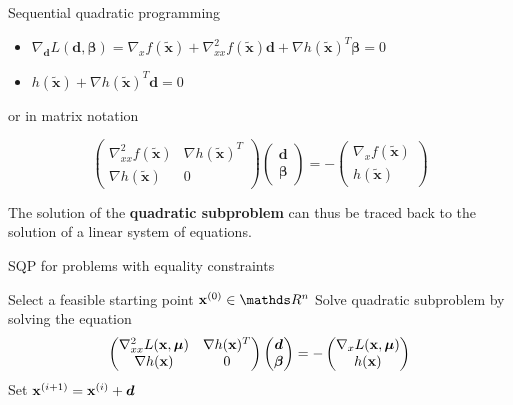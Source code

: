 \begin{vbframe}{Sequential quadratic programming}
\begin{itemize}
\item $\nabla_{\bm{d}} L(\bm{d}, \bm{\beta}) = \nabla_{x} f(\bm{\tilde x}) + \nabla^2_{xx} f(\bm{\tilde x}) \bm{d} + \nabla h(\bm{\tilde x})^T\bm{\beta} = 0$
\item $h(\bm{\tilde x}) + \nabla h(\bm{\tilde x})^T\bm{d} = 0$
\end{itemize}

or in matrix notation

$$
\begin{pmatrix} \nabla^2_{xx} f(\bm{\tilde x}) & \nabla h(\bm{\tilde x})^T \\ \nabla h(\bm{\tilde x}) & 0 \end{pmatrix} \begin{pmatrix} \bm{d} \\ \bm{\beta} \end{pmatrix} = - \begin{pmatrix} \nabla_{x} f(\bm{\tilde x}) \\ h(\bm{\tilde x}) \end{pmatrix}
$$

The solution of the \textbf{quadratic subproblem} can thus be traced back to the solution of a linear system of equations.


\framebreak

\begin{algorithm}[H]
  \caption{SQP for problems with equality constraints}
  \begin{algorithmic}[1]
  \State Select a feasible starting point $\mathbf{x}^{(0)} \in \R^n$
    \State Solve quadratic subproblem by solving the equation
    $$\begin{pmatrix} \nabla^2_{xx} L(\mathbf{x}, \bm{\mu}) & \nabla h(\mathbf{x})^T \\ \nabla h(\mathbf{x}) & 0 \end{pmatrix} \begin{pmatrix} \bm{d} \\ \bm{\beta} \end{pmatrix} = - \begin{pmatrix} \nabla_{x} L(\mathbf{x}, \bm{\mu}) \\ h(\mathbf{x}) \end{pmatrix}$$
    \State Set $\mathbf{x}^{(i + 1)} = \mathbf{x}^{(i)} + \bm{d}$
  \EndWhile
  \end{algorithmic}
\end{algorithm}


\end{vbframe}
